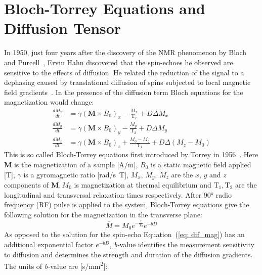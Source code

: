 \section{Bloch-Torrey Equations and Diffusion Tensor}
In 1950, just four years after the discovery of the NMR phenomenon by Bloch and Purcell~\cite{Bloch1946}, Ervin Hahn discovered that the spin-echoes he observed are sensitive to the effects of diffusion. 
He related the reduction of the signal to a dephasing caused by translational diffusion of spins subjected to local magnetic field gradients~\cite{Hahn}. 
In the presence of the diffusion term Bloch equations for the magnetization would change: 
\begin{align}\label{eq:Bloch-Torrey}
\frac{dM_x}{dt}&=\gamma\left(\mathbf{M}\times B_0\right)_x-\frac{M_x}{\mathrm{T_2}}+D\Delta M_x\nonumber\\
\frac{dM_y}{dt}&=\gamma\left(\mathbf{M}\times B_0\right)_y-\frac{M_y}{\mathrm{T_2}}+D\Delta M_y\\
\frac{dM_z}{dt}&=\gamma\left(\mathbf{M}\times B_0\right)_z+\frac{M_0-M_z}{\mathrm{T_1}}+D\Delta(M_z-M_0)\nonumber
\end{align}
This is so called Bloch-Torrey equations first introduced by Torrey in 1956~\cite{Torrey}.
Here $\mathbf{M}$ is the magnetization of a sample [\si{\ampere/\meter}], $B_0$ is a static magnetic field applied [\si{\tesla}], $\gamma$ is a gyromagnetic ratio [\si{\radian/\second \tesla}], $M_x$, $M_y$, $M_z$ are the $x$, $y$ and $z$ components of $\mathbf{M}, M_0$ is magnetization at thermal equilibrium and $\mathrm{T_1}, \mathrm{T_2}$ are the longitudinal and transversal relaxation times respectively. 
After \ang{90} radio frequency (RF) pulse is applied to the system, Bloch-Torrey equations give the following solution for the magnetization in the transverse plane:
\begin{equation}\label{eq: dif_mag}
\bar{M}=M_0e^{-\frac{t}{T_2}}e^{-bD}
\end{equation}
As opposed to the solution for the spin-echo Equation~(\ref{eq: dif_mag}) has an additional exponential factor $e^{-bD}$, \textit{b-}value identifies the measurement sensitivity to diffusion and determines the strength and duration of the diffusion gradients. The units of \textit{b-}value are [\si{\second/\milli\meter\squared}]:
